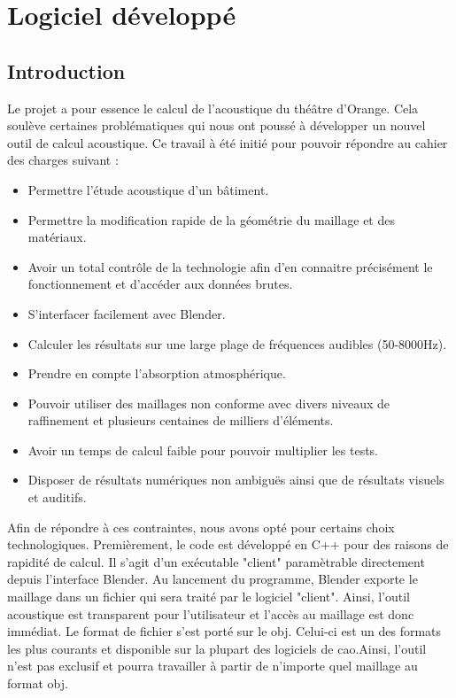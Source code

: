 \chapter{Logiciel développé}
	\minitoc
	\newpage
	
\section{Introduction}
Le projet a pour essence le calcul de l'acoustique du théâtre d'Orange. Cela soulève certaines problématiques qui nous ont poussé à développer un nouvel outil de calcul acoustique. Ce travail à été initié pour pouvoir répondre au cahier des charges suivant :
\begin{itemize}
	\item Permettre l'étude acoustique d'un bâtiment.
	\item Permettre la modification rapide de la géométrie du maillage et des matériaux.
	\item Avoir un total contrôle de la technologie afin d'en connaitre précisément le fonctionnement et d'accéder aux données brutes.
	\item S'interfacer facilement avec Blender.
	\item Calculer les résultats sur une large plage de fréquences audibles (50-8000Hz).
	\item Prendre en compte l'absorption atmosphérique.
	\item Pouvoir utiliser des maillages non conforme avec divers niveaux de raffinement et plusieurs centaines de milliers d'éléments.
	\item Avoir un temps de calcul faible pour pouvoir multiplier les tests.
	\item Disposer de résultats numériques non ambiguës ainsi que de résultats visuels et auditifs.
\end{itemize}

Afin de répondre à ces contraintes, nous avons opté pour certains choix technologiques. Premièrement, le code est développé en C++ pour des raisons de rapidité de calcul. Il s'agit d'un exécutable "client" paramètrable directement depuis l'interface Blender. Au lancement du programme, Blender exporte le maillage dans un fichier qui sera traité par le logiciel "client". Ainsi, l'outil acoustique est transparent pour l'utilisateur et l'accès au maillage est donc immédiat. Le format de fichier s'est porté sur le \gls{obj}. Celui-ci est un des formats les plus courants et disponible sur la plupart des logiciels de \gls{cao}.Ainsi, l'outil n'est pas exclusif et pourra travailler à partir de n'importe quel maillage au format \gls{obj}.


